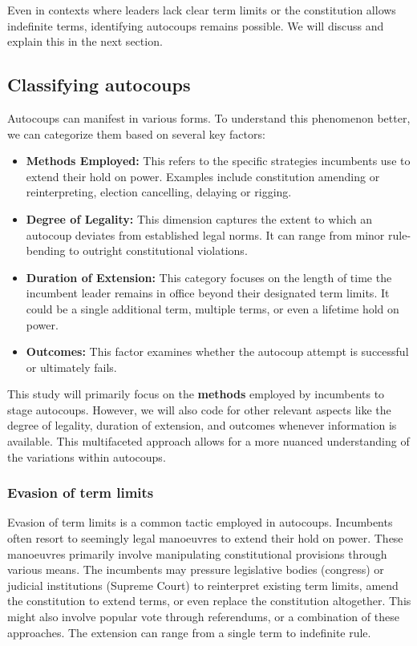 \documentclass[
  12pt,
]{report}
\begin{document}
Even in contexts where leaders lack clear term limits or the
constitution allows indefinite terms, identifying autocoups remains
possible. We will discuss and explain this in the next section.

\subsection{Classifying autocoups}\label{sec-classify}

Autocoups can manifest in various forms. To understand this phenomenon
better, we can categorize them based on several key factors:

\begin{itemize}
\item
  \textbf{Methods Employed:} This refers to the specific strategies
  incumbents use to extend their hold on power. Examples include
  constitution amending or reinterpreting, election cancelling, delaying
  or rigging.
\item
  \textbf{Degree of Legality:} This dimension captures the extent to
  which an autocoup deviates from established legal norms. It can range
  from minor rule-bending to outright constitutional violations.
\item
  \textbf{Duration of Extension:} This category focuses on the length of
  time the incumbent leader remains in office beyond their designated
  term limits. It could be a single additional term, multiple terms, or
  even a lifetime hold on power.
\item
  \textbf{Outcomes:} This factor examines whether the autocoup attempt
  is successful or ultimately fails.
\end{itemize}

This study will primarily focus on the \textbf{methods} employed by
incumbents to stage autocoups. However, we will also code for other
relevant aspects like the degree of legality, duration of extension, and
outcomes whenever information is available. This multifaceted approach
allows for a more nuanced understanding of the variations within
autocoups.

\subsubsection*{Evasion of term limits}\label{evasion-of-term-limits}

Evasion of term limits is a common tactic employed in autocoups.
Incumbents often resort to seemingly legal manoeuvres to extend their
hold on power. These manoeuvres primarily involve manipulating
constitutional provisions through various means. The incumbents may
pressure legislative bodies (congress) or judicial institutions (Supreme
Court) to reinterpret existing term limits, amend the constitution to
extend terms, or even replace the constitution altogether. This might
also involve popular vote through referendums, or a combination of these
approaches. The extension can range from a single term to indefinite
rule.
\end{document}
